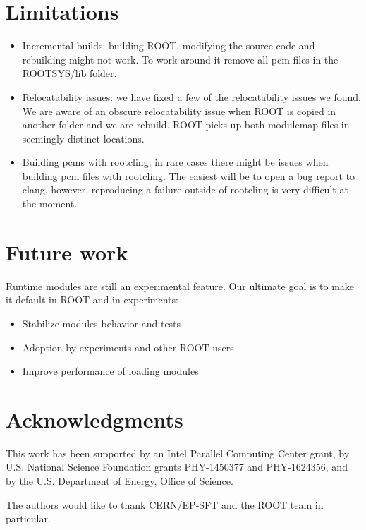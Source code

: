 \documentclass{webofc}
\begin{document}
\section{Limitations}
\begin{itemize}
\item Incremental builds: building ROOT, modifying the source code and rebuilding might not work. To work around it remove all pcm files in the ROOTSYS/lib folder.

\item Relocatability issues: we have fixed a few of the relocatability issues we
found. We are aware of an obscure relocatability issue when ROOT is copied in another folder and we are rebuild. ROOT picks up both modulemap files in seemingly distinct locations.

\item Building pcms with rootcling: in rare cases there might be issues when building pcm files with rootcling. The easiest will be to open a bug report to clang, however, reproducing a failure outside of rootcling is very difficult at the moment.
\end{itemize}

\section{Future work}
Runtime modules are still an experimental feature. Our ultimate goal is to make it default in ROOT and in experiments:

\begin{itemize}
    \item Stabilize modules behavior and tests
    \item Adoption by experiments and other ROOT users
    \item Improve performance of loading modules
\end{itemize}


\section{Acknowledgments}

This work has been supported by an Intel Parallel Computing Center grant, by U.S. National Science Foundation grants PHY-1450377 and PHY-1624356, and by the U.S. Department of Energy, Office of Science.

The authors would like to thank CERN/EP-SFT and the ROOT team in particular.
\end{document}
